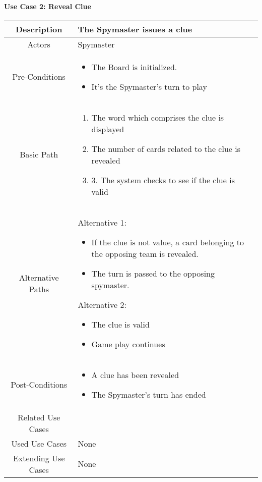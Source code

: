 \documentclass[10pt, a4paper]{article}
\begin{document}
	
	\paragraph{Use Case 2: Reveal Clue}
		\begin{center}
		\begin{tabular}{ |c|p{7cm}| } 
			\hline
			Description & The Spymaster issues a clue \\ 
			\hline
			Actors & Spymaster \\
			\hline 
			Pre-Conditions & \begin{itemize}
				\item The Board is initialized.
				\item It's the Spymaster's turn to play  
			\end{itemize} \\
			\hline
			Basic Path & 
				\begin{enumerate}
					\item The word which comprises the clue is displayed 
					\item The number of cards related to the clue is revealed
					\item 3.	The system checks to see if the clue is valid 
				\end{enumerate} \\
			\hline 
			Alternative Paths & Alternative 1: \begin{itemize}
				\item If the clue is not value, a card belonging to the opposing team is revealed. 
				\item The turn is passed to the opposing spymaster.
			\end{itemize}
	
			Alternative 2:
			\begin{itemize}
			\item	The clue is valid
			\item 	Game play continues 
			\end{itemize}
			 \\
			\hline 
			Post-Conditions & 
				\begin{itemize}
					\item A clue has been revealed
					\item The Spymaster’s turn has ended 
				\end{itemize} \\
			\hline 
			Related Use Cases & \\
			\hline 
			Used Use Cases & None \\
			\hline
			Extending Use Cases & None \\
			\hline
		\end{tabular}
	\end{center}
		
\end{document}
